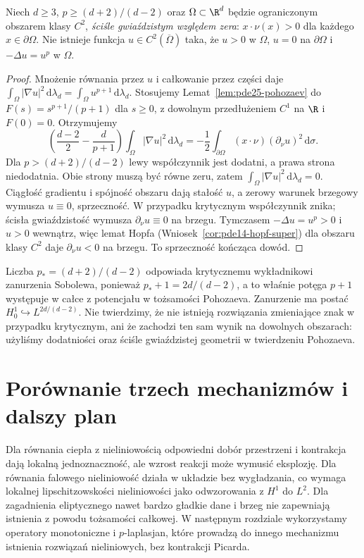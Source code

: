 \begin{twierdzenie}
\label{thm:pde25-pohozaev-nonexist}
Niech $d\ge3$, $p\ge(d+2)/(d-2)$ oraz
$\Omega\subset\R^d$ będzie ograniczonym obszarem klasy
$C^2$, \emph{ściśle gwiaździstym względem zera}:
$x\cdot\nu(x)>0$ dla każdego $x\in\partial\Omega$.
Nie istnieje funkcja $u\in C^2(\overline\Omega)$
taka, że $u>0$ w $\Omega$, $u=0$ na $\partial\Omega$
i $-\Delta u=u^p$ w $\Omega$.
\end{twierdzenie}
\begin{proof}
Mnożenie równania przez $u$ i całkowanie przez części
daje $\int_\Omega|\nabla u|^2\,\mathrm d\lambda_d
=\int_\Omega u^{p+1}\,\mathrm d\lambda_d$.
Stosujemy Lemat~\ref{lem:pde25-pohozaev}
do $F(s)=s^{p+1}/(p+1)$ dla $s\ge0$,
z dowolnym przedłużeniem $C^1$ na $\R$ i $F(0)=0$.
Otrzymujemy
\[
 \left(\frac{d-2}{2}-\frac{d}{p+1}\right)
 \int_\Omega|\nabla u|^2\,\mathrm d\lambda_d
 =-\frac12\int_{\partial\Omega}(x\cdot\nu)
 (\partial_\nu u)^2\,\mathrm d\sigma.
\]
Dla $p>(d+2)/(d-2)$ lewy współczynnik jest dodatni,
a prawa strona niedodatnia. Obie strony muszą być
równe zeru, zatem $\int_\Omega|\nabla u|^2\,\mathrm d\lambda_d=0$.
Ciągłość gradientu i spójność obszaru dają stałość $u$,
a zerowy warunek brzegowy wymusza $u\equiv0$,
sprzeczność. W przypadku krytycznym współczynnik
znika; ścisła gwiaździstość wymusza
$\partial_\nu u\equiv0$ na brzegu. Tymczasem $-\Delta u=u^p>0$
i $u>0$ wewnątrz, więc lemat Hopfa (Wniosek~\ref{cor:pde14-hopf-super})
dla obszaru klasy $C^2$ daje $\partial_\nu u<0$ na brzegu.
To sprzeczność kończąca dowód.
\end{proof}

\begin{uwaga}
Liczba $p_*=(d+2)/(d-2)$ odpowiada krytycznemu
wykładnikowi zanurzenia Sobolewa, ponieważ
$p_*+1=2d/(d-2)$, a to właśnie potęga $p+1$
występuje w całce z potencjału w tożsamości Pohozaeva.
Zanurzenie ma postać $H_0^1\hookrightarrow L^{2d/(d-2)}$.
Nie twierdzimy, że nie istnieją rozwiązania zmieniające znak
w przypadku krytycznym, ani że zachodzi ten sam wynik
na dowolnych obszarach: użyliśmy dodatniości oraz
ściśle gwiaździstej geometrii w twierdzeniu Pohozaeva.
\end{uwaga}

\section{Porównanie trzech mechanizmów i dalszy plan}
Dla równania ciepła z nieliniowością odpowiedni dobór
przestrzeni i kontrakcja dają lokalną jednoznaczność,
ale wzrost reakcji może wymusić eksplozję. Dla równania
falowego nieliniowość działa w układzie bez wygładzania,
co wymaga lokalnej lipschitzowskości nieliniowości
jako odwzorowania z $H^1$ do $L^2$. Dla zagadnienia
eliptycznego nawet bardzo gładkie dane i brzeg nie
zapewniają istnienia z powodu tożsamości całkowej.
W następnym rozdziale wykorzystamy operatory monotoniczne
i $p$-laplasjan, które prowadzą do innego mechanizmu istnienia
rozwiązań nieliniowych, bez kontrakcji Picarda.


